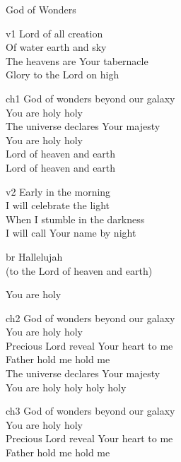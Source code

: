 \begin{song}{God of Wonders}

    \begin{songframe}{v1}
        Lord of all creation \\
        Of water earth and sky \\
        The heavens are Your tabernacle \\
        Glory to the Lord on high
    \end{songframe}

    \begin{songframe}{ch1}
        God of wonders beyond our galaxy \\
        You are holy holy \\
        The universe declares Your majesty \\
        You are holy holy \\
        Lord of heaven and earth \\
        Lord of heaven and earth
    \end{songframe}

    \begin{songframe}{v2}
        Early in the morning \\
        I will celebrate the light \\
        When I stumble in the darkness \\
        I will call Your name by night
    \end{songframe}

    \begin{songframe}{br}
        Hallelujah \\
        (to the Lord of heaven and earth)

        You are holy
    \end{songframe}

    \begin{songframe}{ch2}
        God of wonders beyond our galaxy \\
        You are holy holy \\
        Precious Lord reveal Your heart to me \\
        Father hold me hold me \\
        The universe declares Your majesty \\
        You are holy holy holy holy
    \end{songframe}

    \begin{songframe}{ch3}
        God of wonders beyond our galaxy \\
        You are holy holy \\
        Precious Lord reveal Your heart to me \\
        Father hold me hold me
    \end{songframe}


\end{song}
